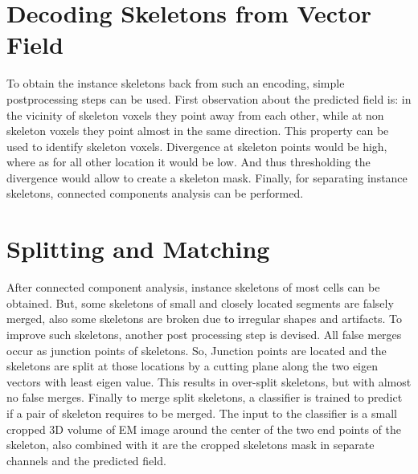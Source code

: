 \section{Decoding Skeletons from Vector Field}
To obtain the instance skeletons back from such an encoding, simple postprocessing steps can be used. First observation about the predicted field is: in the vicinity of skeleton voxels they point away from each other, while at non skeleton voxels they point almost in the same direction. This property can be used to identify skeleton voxels. Divergence at skeleton points would be high, where as for all other location it would be low. And thus thresholding the divergence would allow to create a skeleton mask. Finally, for separating instance skeletons, connected components analysis can be performed.

\section{Splitting and Matching}
After connected component analysis, instance skeletons of most cells can be obtained. But, some skeletons of small and closely located segments are falsely merged, also some skeletons are broken due to irregular shapes and artifacts. To improve such skeletons, another post processing step is devised. 
All false merges occur as junction points of skeletons. So, Junction points are located and the skeletons are split at those locations by a cutting plane along the two eigen vectors with least eigen value.
This results in over-split skeletons, but with almost no false merges.
Finally to merge split skeletons, a classifier is trained to predict if a pair of skeleton requires to be merged. The input to the classifier is a small cropped 3D volume of EM image around the center of the two end points of the skeleton, also combined with it are the cropped skeletons mask in separate channels and the predicted field.

